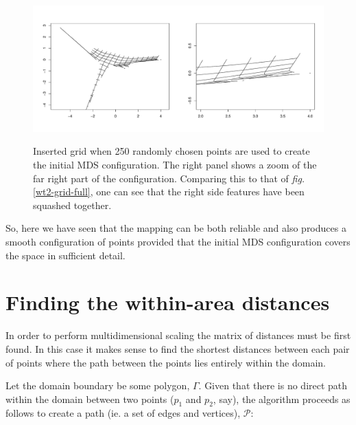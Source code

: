 \documentclass[a4paper,10pt]{article}
\newcommand{\fig}[1]{\emph{fig.} \ref{#1}}
\begin{document}
\begin{figure}
\centering
\includegraphics[width=5in]{figs/wt2-grid-samp.pdf} \\
\caption{Inserted grid when 250 randomly chosen points are used to create the initial MDS configuration. The right panel shows a zoom of the far right part of the configuration. Comparing this to that of \fig{wt2-grid-full}, one can see that the right side features have been squashed together.}
\label{wt2-grid-samp}
\end{figure}

So, here we have seen that the mapping can be both reliable and also produces a smooth configuration of points provided that the initial MDS configuration covers the space in sufficient detail.


\section{Finding the within-area distances}

In order to perform multidimensional scaling the matrix of distances must be first found. In this case it makes sense to find the shortest distances between each pair of points where the path between the points lies entirely within the domain.

Let the domain boundary be some polygon, $\Gamma$. Given that there is no direct path within the domain between two points ($p_1$ and $p_2$, say), the algorithm proceeds as follows to create a path (ie. a set of edges and vertices), $\mathcal{P}$:
\end{document}
